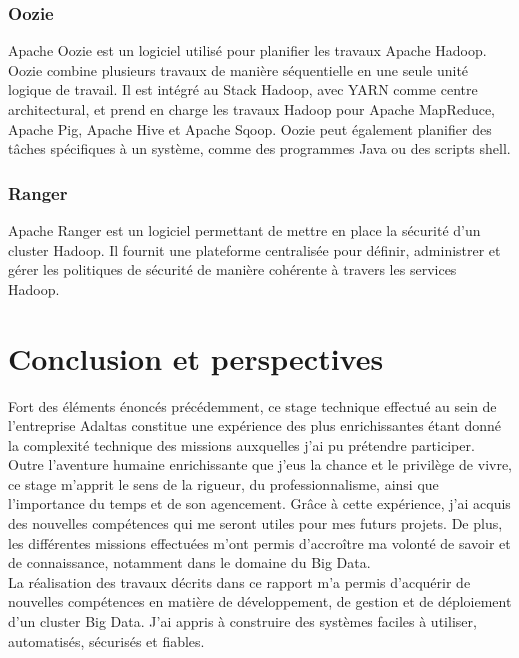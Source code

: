 \documentclass[12pt, french]{report}
\begin{document}
\subsection{Oozie}

Apache Oozie est un logiciel utilisé pour planifier les travaux Apache Hadoop. Oozie combine plusieurs travaux de manière séquentielle en une seule unité logique de travail. Il est intégré au Stack Hadoop, avec YARN comme centre architectural, et prend en charge les travaux Hadoop pour Apache MapReduce, Apache Pig, Apache Hive et Apache Sqoop. Oozie peut également planifier des tâches spécifiques à un système, comme des programmes Java ou des scripts shell.

\subsection{Ranger}

Apache Ranger est un logiciel permettant de mettre en place la sécurité d'un cluster Hadoop. Il fournit une plateforme centralisée pour définir, administrer et gérer les politiques de sécurité de manière cohérente à travers les services Hadoop.

\chapter*{Conclusion et perspectives}

Fort des éléments énoncés précédemment, ce stage technique effectué au sein de l’entreprise Adaltas constitue une expérience des plus enrichissantes étant donné la complexité technique des missions auxquelles j'ai pu prétendre participer. Outre l’aventure humaine enrichissante que j’eus la chance et le privilège de vivre, ce stage m’apprit le sens de la rigueur, du professionnalisme, ainsi que l’importance du temps et de son agencement. Grâce à cette expérience, j’ai acquis des nouvelles compétences qui me seront utiles pour mes futurs projets. De plus, les différentes missions effectuées m’ont permis d’accroître ma volonté de savoir et de connaissance, notamment dans le domaine du Big Data.\\

La réalisation des travaux décrits dans ce rapport m'a permis d'acquérir de nouvelles compétences en matière de développement, de gestion et de déploiement d'un cluster Big Data. J'ai appris à construire des systèmes faciles à utiliser, automatisés, sécurisés et fiables.\\
\end{document}
